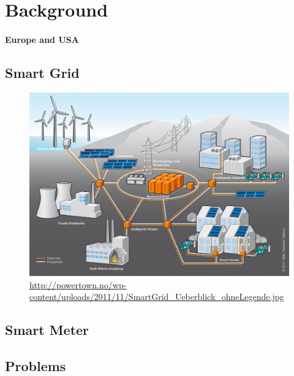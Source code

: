 \section{Background}

\paragraph{Europe and USA}

\subsection{Smart Grid}

\begin{figure}
	\includegraphics[width=\textwidth]{figures/SmartGrid_Ueberblick_ohneLegende.jpg}
	\caption{\url{http://powertown.no/wp-content/uploads/2011/11/SmartGrid_Ueberblick_ohneLegende.jpg}}
	\label{fig:background:smartgrid}
\end{figure}

\subsection{Smart Meter}

\subsection{Problems}
